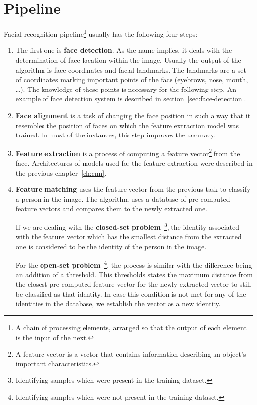 \section{Pipeline}\label{sec:pipeline}
Facial recognition pipeline\footnote{\label{foot:pipe}A chain of processing elements, arranged so that the output of
each element is the input of the next.} usually has the following four steps:
\begin{enumerate}
    \item The first one is \textbf{face detection}.
    As the name implies, it deals with the determination of face location within the image.
    Usually the output of the algorithm is face coordinates and facial landmarks.
    The landmarks are a set of coordinates marking important points of the face (eyebrows, nose, mouth, \ldots).
    The knowledge of these points is necessary for the following step.
    An example of face detection system is described in section~\ref{sec:face-detection}.
    \item \textbf{Face alignment} is a task of changing the face position in such a way that it resembles the position
    of faces on which the feature extraction model was trained.
    In most of the instances, this step improves the accuracy.
    \item \textbf{Feature extraction} is a process of computing a feature vector\footnote{A feature vector is a vector
    that contains information describing an object's important characteristics.} from the face.
    Architectures of models used for the feature extraction were described in the previous chapter~\ref{ch:cnn}.
    \item \textbf{Feature matching} uses the feature vector from the previous task to classify a person in the image.
    The algorithm uses a database of pre-computed feature vectors and compares them to the newly extracted one.

    If we are dealing with the \textbf{closed-set problem}~\footnote{\label{foot:closedset}Identifying samples which
    were present in the training dataset.}, the identity associated with the feature vector which has
    the smallest distance from the extracted one is considered to be the identity of the person in the image.

    For the \textbf{open-set problem}~\footnote{\label{foot:openset}Identifying samples which were not present in the
    training dataset.}, the process is similar with the difference being an addition of a threshold.
    This thresholds states the maximum distance from the closest pre-computed feature vector for the newly extracted
    vector to still be classified as that identity.
    In case this condition is not met for any of the identities in the database, we establish the vector as a new
    identity.
\end{enumerate}

